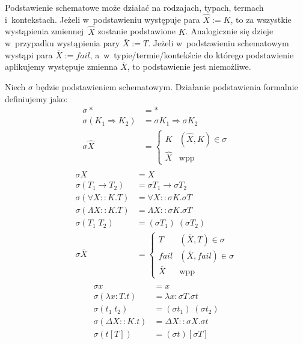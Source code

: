 \documentclass[11pt,leqno]{article}
\begin{document}
\begin{definicja}
Podstawienie schematowe może działać na rodzajach, typach, termach i~kontekstach. Jeżeli w~podstawieniu występuje
para $\widehat{X} := K$, to za wszystkie wystąpienia zmiennej~$\widehat{X}$ zostanie podstawione $K$. Analogicznie
się dzieje w~przypadku wystąpienia pary $\bar{X} := T$. Jeżeli w~podstawieniu schematowym wystąpi para $\bar{X} := fail$,
a~w~typie/termie/kontekście do którego podstawienie aplikujemy występuje zmienna $\bar{X}$, to podstawienie jest niemożliwe.

Niech $\sigma$ będzie podstawieniem schematowym. Działanie podstawienia formalnie definiujemy jako:
\begin{align*}
\sigma * & = * \\
\sigma (K_1 \Rightarrow K_2) & = \sigma K_1 \Rightarrow \sigma K_2 \\
\sigma \widehat{X} & = 
	\begin{cases}
		K & (\widehat{X},K) \in \sigma \\
		\widehat{X} & \textrm{wpp}
	\end{cases} \\
\end{align*}
\begin{align*}
\sigma X & = X \\
\sigma(T_1 \to T_2) & = \sigma T_1 \to \sigma T_2 \\
\sigma(\forall X :: K.T) & = \forall X :: \sigma K. \sigma T \\
\sigma(\Lambda X :: K.T) & = \Lambda X :: \sigma K. \sigma T \\
\sigma(T_1 \; T_2) & = (\sigma T_1) \; (\sigma T_2) \\
\sigma \bar{X} & = 
	\begin{cases}
		T & (\bar{X},T) \in \sigma \\
		fail & (\bar{X},fail) \in \sigma \\
		\bar{X} & \textrm{wpp}
	\end{cases} \\
\end{align*}
\begin{align*}
\sigma x & = x \\
\sigma (\lambda x : T.t) & = \lambda x : \sigma T. \sigma t \\
\sigma (t_1 \; t_2) & = (\sigma t_1) \; (\sigma t_2) \\
\sigma (\Delta X :: K. t) & = \Delta X :: \sigma X . \sigma t \\
\sigma (t[T]) & = (\sigma t)[\sigma T] \\

\end{align*}
\end{definicja}
\end{document}
